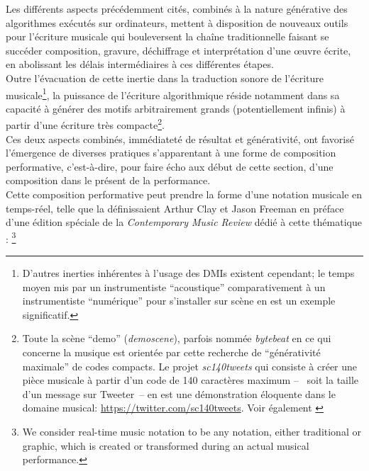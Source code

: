 \noindent Les différents aspects précédemment cités, combinés à la nature générative des algorithmes exécutés sur ordinateurs, mettent à disposition de nouveaux outils pour l'écriture musicale qui bouleversent la chaîne traditionnelle faisant se succéder composition, gravure, déchiffrage et interprétation d'une œuvre écrite, en abolissant les délais intermédiaires à ces différentes étapes.\\
\indent Outre l'évacuation de cette inertie dans la traduction sonore de l'écriture musicale\footnote{D'autres inerties inhérentes à l'usage des \glspl{DMI} existent cependant; le temps moyen mis par un instrumentiste ``acoustique'' comparativement à un instrumentiste ``numérique'' pour s'installer sur scène en est un exemple significatif.}, la puissance de l'écriture algorithmique réside notamment dans sa capacité à générer des motifs arbitrairement grands (potentiellement infinis) à partir d'une écriture très compacte\footnote{Toute la scène ``demo'' (\textit{demoscene}), parfois nommée \textit{bytebeat} en ce qui concerne la musique est orientée par cette recherche de ``générativité maximale'' de codes compacts. Le projet \textit{sc140tweets} qui consiste à créer une pièce musicale à partir d'un code de 140 caractères maximum --~ soit la taille d'un message sur Tweeter~-- en est une démonstration éloquente dans le domaine musical: \url{https://twitter.com/sc140tweets}. Voir également \cite{heikkila_discovering_2011}}.\\
\indent Ces deux aspects combinés, immédiateté de résultat et générativité, ont favorisé l'émergence de diverses pratiques s'apparentant à une forme de composition performative, c'est-à-dire, pour faire écho aux début de cette section, d'une composition dans le présent de la performance.\\
\indent Cette composition performative peut prendre la forme d'une notation musicale en temps-réel, telle que la définissaient Arthur Clay et Jason Freeman en préface d'une édition spéciale de la \textit{Contemporary Music Review} dédié à cette thématique \cite{clay_preface_2010}: \footnote{We consider real-time music notation to be any notation, either traditional or graphic, which is created or transformed during an actual musical performance.}\\
